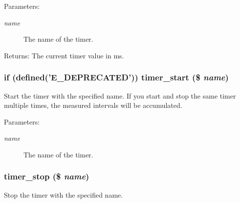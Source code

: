 \begin{Desc}
\item[Parameters:]
\begin{description}
\item[{\em name}]The name of the timer. \end{description}
\end{Desc}
\begin{Desc}
\item[Returns:]The current timer value in ms. \end{Desc}
\hypertarget{bootstrap_8inc_a033ad6f8e530b98c9024a20e554423b}{
\subsubsection[{timer\_\-start}]{\setlength{\rightskip}{0pt plus 5cm}if (defined('E\_\-DEPRECATED')) timer\_\-start (\$ {\em name})}}
\label{bootstrap_8inc_a033ad6f8e530b98c9024a20e554423b}


Start the timer with the specified name. If you start and stop the same timer multiple times, the measured intervals will be accumulated.

\begin{Desc}
\item[Parameters:]
\begin{description}
\item[{\em name}]The name of the timer. \end{description}
\end{Desc}
\hypertarget{bootstrap_8inc_8cb56b8962398895710c35a3584a7d11}{
\subsubsection[{timer\_\-stop}]{\setlength{\rightskip}{0pt plus 5cm}timer\_\-stop (\$ {\em name})}}
\label{bootstrap_8inc_8cb56b8962398895710c35a3584a7d11}


Stop the timer with the specified name.

